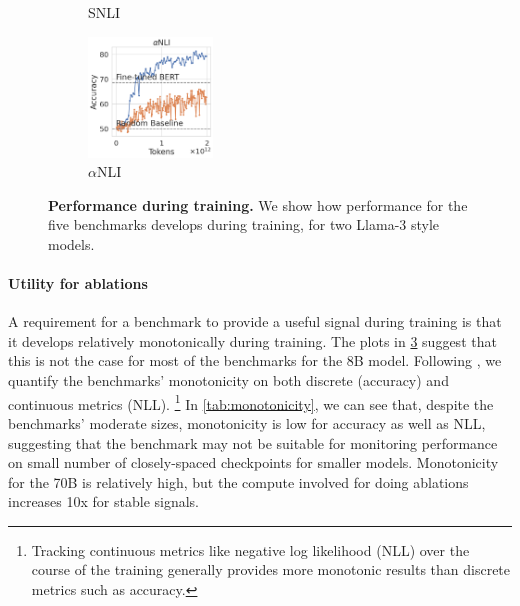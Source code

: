 \begin{figure}[t]
\begin{subfigure}[b]{0.19\textwidth}
    \caption{SNLI}
    \label{fig:snli_int}
    \end{subfigure}
    \begin{subfigure}[b]{0.19\textwidth}
    \centering
    \includegraphics[height=3.2cm, trim=11mm 0 0 0, clip]{figures/abductivenli_intermediate}
    \caption{$\alpha$NLI}
    \label{fig:alphanli_int}
    \end{subfigure}
    \caption{\textbf{Performance during training.} We show how performance for the five benchmarks develops during training, for two Llama-3 style models.}\label{fig:performance_training}
\end{figure}

\paragraph{Utility for ablations}
A requirement for a benchmark to provide a useful signal during training is that it develops relatively monotonically during training.
The plots in \cref{fig:performance_training} suggest that this is not the case for most of the benchmarks for the 8B model.
Following \citet{variancepaper}, we quantify the benchmarks' monotonicity on both discrete (accuracy) and continuous metrics (NLL).%
\footnote{Tracking continuous metrics like negative log likelihood (NLL) over the course of the training generally provides more monotonic results than discrete metrics such as accuracy.}
In \cref{tab:monotonicity}, we can see that, despite the benchmarks' moderate sizes, monotonicity is low for accuracy as well as NLL, suggesting that the benchmark may not be suitable for monitoring performance on small number of closely-spaced checkpoints for smaller models. Monotonicity for the 70B is relatively high, but the compute involved for doing ablations increases 10x for stable signals.

